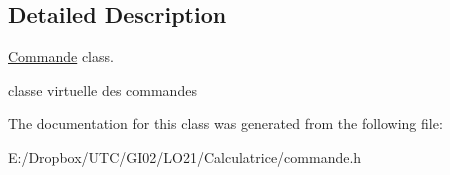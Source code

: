 \subsection{Detailed Description}
\hyperlink{class_commande}{Commande} class. 

classe virtuelle des commandes 

The documentation for this class was generated from the following file\-:\begin{DoxyCompactItemize}
\item 
E\-:/\-Dropbox/\-U\-T\-C/\-G\-I02/\-L\-O21/\-Calculatrice/commande.\-h\end{DoxyCompactItemize}
